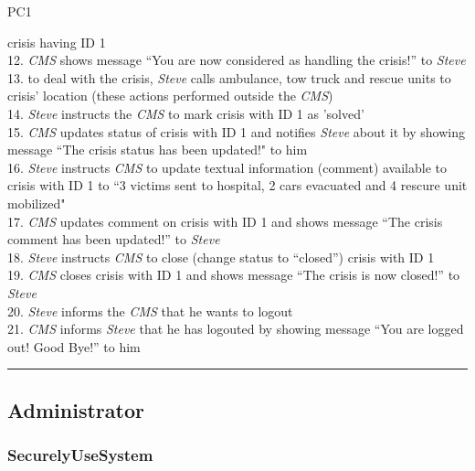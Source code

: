 \begin{lyxlist}{PC1}
{crisis having ID 1\\
12. \emph{CMS} shows message ``You are now considered as handling the crisis!''
to \emph{Steve}\\
13. to deal with the crisis, \emph{Steve} calls ambulance, tow truck and rescue
units to crisis' location (these actions performed outside the \emph{CMS})\\
14. \emph{Steve} instructs the \emph{CMS} to mark crisis with ID 1 as 'solved'\\
15. \emph{CMS} updates status of crisis with ID 1 and notifies \emph{Steve}
about it by showing message ``The crisis status has been updated!" to him\\
16. \emph{Steve} instructs \emph{CMS} to update textual information (comment)
available to crisis with ID 1 to ``3 victims sent to hospital, 2 cars
evacuated and 4 rescure unit mobilized"\\
17. \emph{CMS} updates comment on crisis with ID 1 and shows message ``The
crisis comment has been updated!'' to \emph{Steve}\\
18. \emph{Steve} instructs \emph{CMS} to close (change status to ``closed'')
crisis with ID 1\\
19. \emph{CMS} closes crisis with ID 1 and shows message ``The crisis is now
closed!'' to \emph{Steve}\\
20. \emph{Steve} informs the \emph{CMS} that he wants to logout\\
21. \emph{CMS} informs \emph{Steve} that he has logouted by showing message
``You are logged out! Good Bye!'' to him

}
\end{lyxlist}
\hrule

\subsection{Administrator}

\subsubsection{SecurelyUseSystem}

